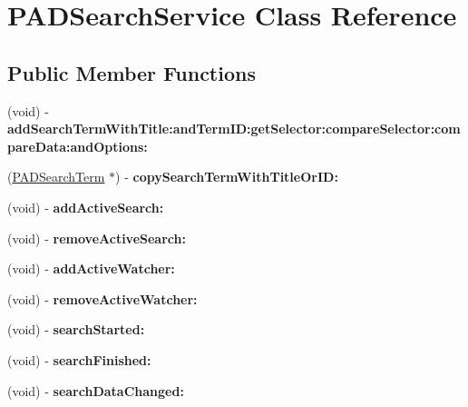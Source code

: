 \hypertarget{interface_p_a_d_search_service}{
\section{PADSearchService Class Reference}
\label{interface_p_a_d_search_service}
}
\subsection*{Public Member Functions}
\begin{DoxyCompactItemize}
\item 
\hypertarget{interface_p_a_d_search_service_a348ddc02a0a596d0ec3b2f5859e17c87}{
(void) -\/ {\bfseries addSearchTermWithTitle:andTermID:getSelector:compareSelector:compareData:andOptions:}}
\label{interface_p_a_d_search_service_a348ddc02a0a596d0ec3b2f5859e17c87}

\item 
\hypertarget{interface_p_a_d_search_service_a09bb83a718b06d1ddeae43f68bc326dc}{
(\hyperlink{interface_p_a_d_search_term}{PADSearchTerm} $\ast$) -\/ {\bfseries copySearchTermWithTitleOrID:}}
\label{interface_p_a_d_search_service_a09bb83a718b06d1ddeae43f68bc326dc}

\item 
\hypertarget{interface_p_a_d_search_service_ad5641023d33bdfd002e9c60bbe376584}{
(void) -\/ {\bfseries addActiveSearch:}}
\label{interface_p_a_d_search_service_ad5641023d33bdfd002e9c60bbe376584}

\item 
\hypertarget{interface_p_a_d_search_service_a0e1dc188856c26bbe458594d664a398f}{
(void) -\/ {\bfseries removeActiveSearch:}}
\label{interface_p_a_d_search_service_a0e1dc188856c26bbe458594d664a398f}

\item 
\hypertarget{interface_p_a_d_search_service_a93bc0a5f8ad5c5a775dce5c3346aa2b3}{
(void) -\/ {\bfseries addActiveWatcher:}}
\label{interface_p_a_d_search_service_a93bc0a5f8ad5c5a775dce5c3346aa2b3}

\item 
\hypertarget{interface_p_a_d_search_service_a984e24b7edffc817aa365d7dbd17f4e3}{
(void) -\/ {\bfseries removeActiveWatcher:}}
\label{interface_p_a_d_search_service_a984e24b7edffc817aa365d7dbd17f4e3}

\item 
\hypertarget{interface_p_a_d_search_service_a465c1e09acd791ae9c87e260547d8b98}{
(void) -\/ {\bfseries searchStarted:}}
\label{interface_p_a_d_search_service_a465c1e09acd791ae9c87e260547d8b98}

\item 
\hypertarget{interface_p_a_d_search_service_a1f0b92def5f5274c2f5a21e75bb4036a}{
(void) -\/ {\bfseries searchFinished:}}
\label{interface_p_a_d_search_service_a1f0b92def5f5274c2f5a21e75bb4036a}

\item 
\hypertarget{interface_p_a_d_search_service_a425959936ee605d035ec4844bf05b1a0}{
(void) -\/ {\bfseries searchDataChanged:}}
\label{interface_p_a_d_search_service_a425959936ee605d035ec4844bf05b1a0}

\end{DoxyCompactItemize}
